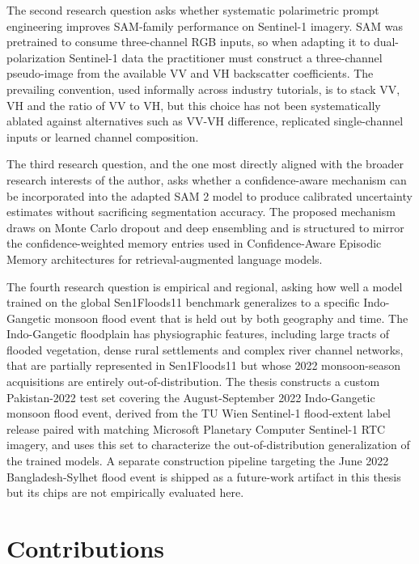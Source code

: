 \documentclass[11pt,a4paper,oneside]{report}
\begin{document}
The second research question asks whether systematic polarimetric prompt engineering improves SAM-family performance on Sentinel-1 imagery. SAM was pretrained to consume three-channel RGB inputs, so when adapting it to dual-polarization Sentinel-1 data the practitioner must construct a three-channel pseudo-image from the available VV and VH backscatter coefficients. The prevailing convention, used informally across industry tutorials, is to stack VV, VH and the ratio of VV to VH, but this choice has not been systematically ablated against alternatives such as VV-VH difference, replicated single-channel inputs or learned channel composition.

The third research question, and the one most directly aligned with the broader research interests of the author, asks whether a confidence-aware mechanism can be incorporated into the adapted SAM 2 model to produce calibrated uncertainty estimates without sacrificing segmentation accuracy. The proposed mechanism draws on Monte Carlo dropout and deep ensembling and is structured to mirror the confidence-weighted memory entries used in Confidence-Aware Episodic Memory architectures for retrieval-augmented language models.

The fourth research question is empirical and regional, asking how well a model trained on the global Sen1Floods11 benchmark generalizes to a specific Indo-Gangetic monsoon flood event that is held out by both geography and time. The Indo-Gangetic floodplain has physiographic features, including large tracts of flooded vegetation, dense rural settlements and complex river channel networks, that are partially represented in Sen1Floods11 but whose 2022 monsoon-season acquisitions are entirely out-of-distribution. The thesis constructs a custom Pakistan-2022 test set covering the August-September 2022 Indo-Gangetic monsoon flood event, derived from the TU Wien Sentinel-1 flood-extent label release paired with matching Microsoft Planetary Computer Sentinel-1 RTC imagery, and uses this set to characterize the out-of-distribution generalization of the trained models. A separate construction pipeline targeting the June 2022 Bangladesh-Sylhet flood event is shipped as a future-work artifact in this thesis but its chips are not empirically evaluated here.

\section{Contributions}
\end{document}

